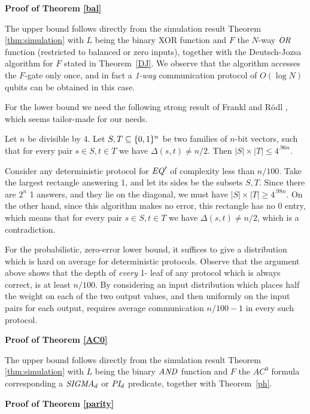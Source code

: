 \noindent
{\bf Proof of Theorem \ref{bal}}

The upper bound follows directly from the simulation result Theorem
\ref{thm:simulation} with $L$ being the binary XOR function and $F$ the
$N$-way $\mbox{\it OR\/}$ function (restricted to balanced or zero inputs), 
together with the Deutsch-Jozsa algorithm for $F$
\cite{DJ92} stated in Theorem~\ref{DJ}.
We observe that the algorithm accesses the $F$-gate only once, and in fact 
a {\em 1-way} communication protocol of $O(\log N)$ qubits can be obtained 
in this case.

For the lower bound we need the following strong result of Frankl and
R\"odl \cite{FR87}, which seems tailor-made for our needs.

\begin{theorem}\label{FR}\cite{FR87}
Let $n$ be divisible by 4.
Let $S,T \subseteq \{0,1\}^n$ be two families of $n$-bit vectors, such that
for every pair $s\in S, t\in T$ we have $\Delta(s,t) \neq n/2$.
Then $|S|\times|T| \leq 4^{.96n}$.
\end{theorem}

Consider any deterministic protocol for $\mbox{\it EQ\/}^{\prime}$ 
of complexity less than $n/100$.
Take the largest rectangle answering 1, and let its 
sides be the subsets $S,T$. Since there are $2^n$ 1 answers, 
and they lie on the diagonal, we must 
have $|S|\times|T| \geq 4^{.98n}$. On the other hand, since this 
algorithm makes no error, this rectangle has no 0 entry, which means 
that for every pair $s\in S, t\in T$ we have $\Delta(s,t) \neq n/2$, 
which is a contradiction.

For the probabilistic, zero-error lower bound, 
it suffices to give a distribution which is hard on average for
deterministic protocols.
Observe that the argument
above shows that the depth of {\em every} 1- leaf of any protocol which
is always correct, is at least $n/100$. By considering an input
distribution which places half the weight on each of the two output
values, and then uniformly on the input pairs for each output,
requires average communication $n/100 -1$ in every such protocol.\ee

\noindent
{\bf Proof of Theorem \ref{AC0}}

The upper bound follows directly from the simulation result Theorem
\ref{thm:simulation} with $L$ being the binary $\mbox{\it AND\/}$ function and $F$ 
the $AC^0$ formula corresponding a $\mbox{\it SIGMA}_d$ or $\mbox{\it PI}_d$ 
predicate, together with Theorem~\ref{ph}.\ee


\noindent
{\bf Proof of Theorem \ref{parity}}

